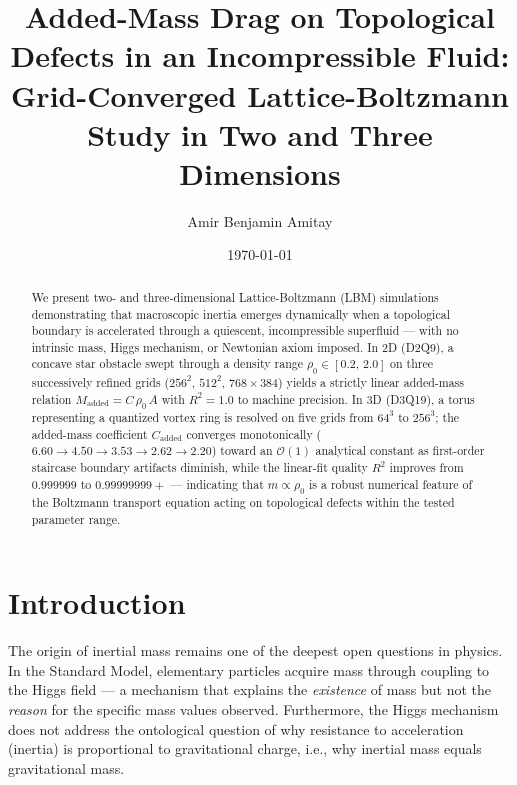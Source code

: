 \documentclass[reprint,amsmath,amssymb,aps,pre,floatfix]{revtex4-2}
\begin{document}

\title{Added-Mass Drag on Topological Defects in an Incompressible Fluid:\\
Grid-Converged Lattice-Boltzmann Study in Two and Three Dimensions}

\author{Amir Benjamin Amitay}

\date{\today}

\begin{abstract}
We present two- and three-dimensional Lattice-Boltzmann (LBM) simulations
demonstrating that macroscopic inertia emerges dynamically when a topological
boundary is accelerated through a quiescent, incompressible superfluid ---
with no intrinsic mass, Higgs mechanism, or Newtonian axiom imposed.
In 2D (D2Q9), a concave star obstacle swept through a density range
$\rho_0\in[0.2,\,2.0]$ on three successively refined grids
($256^{2}$, $512^{2}$, $768\times384$) yields a strictly linear added-mass
relation $M_{\mathrm{added}}=C\,\rho_0\,A$ with $R^{2}=1.0$ to machine
precision.  In 3D (D3Q19), a torus representing a quantized vortex ring is
resolved on five grids from $64^{3}$ to $256^{3}$; the added-mass
coefficient $C_{\mathrm{added}}$ converges monotonically
($6.60\to4.50\to3.53\to2.62\to2.20$) toward an $\mathcal{O}(1)$
analytical constant as first-order staircase boundary artifacts diminish,
while the linear-fit quality $R^{2}$ improves from $0.999999$ to
$0.99999999{+}$ --- indicating that $m\propto\rho_0$ is a
robust numerical feature of the Boltzmann transport equation acting
on topological defects within the tested parameter range.
\end{abstract}

\maketitle

\section{Introduction}
\label{sec:intro}

The origin of inertial mass remains one of the deepest open questions in
physics.  In the Standard Model, elementary particles acquire mass through
coupling to the Higgs field --- a mechanism that explains the
\emph{existence} of mass but not the \emph{reason} for the specific mass
values observed.  Furthermore, the Higgs mechanism does not address the
ontological question of why resistance to acceleration (inertia) is
proportional to gravitational charge, i.e., why inertial mass equals
gravitational mass.
\end{document}
